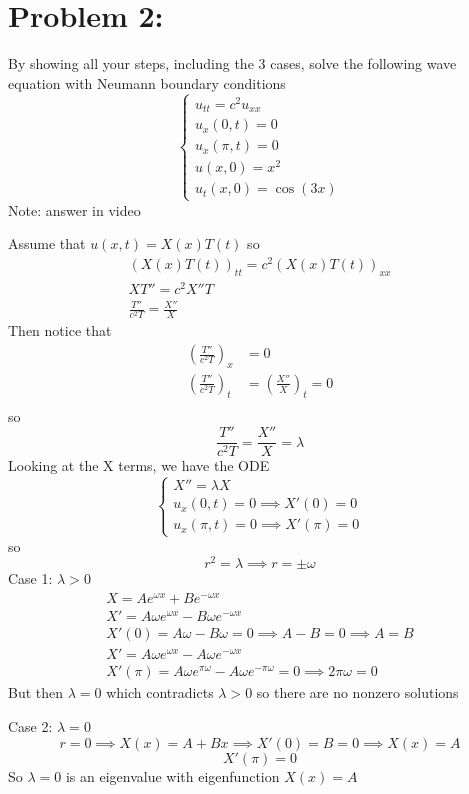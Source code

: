 \documentclass[12pt]{article}
\begin{document}
\pagebreak
\section*{Problem 2:}
By showing all your steps, including the 3 cases, solve the following wave equation with Neumann boundary conditions
\[\begin{cases}
    u_{tt} = c^2u_{xx}\\
    u_x(0, t) = 0\\
    u_x(\pi, t) = 0\\
    u(x, 0) = x^2\\
    u_t(x, 0) = \cos(3x)
\end{cases}\]
Note: answer in video 

\color{blue}
Assume that $u(x, t) = X(x)T(t)$ so
\begin{gather*}
    ( X(x)T(t))_{tt} = c^2( X(x)T(t))_{xx}\\
    XT'' = c^2 X'' T\\
    \frac{T''}{c^2T} = \frac{X''}{X}
\end{gather*}
Then notice that 
\begin{align*}
    \left(\frac{T''}{c^2T}\right)_x &= 0\\
    \left(\frac{T''}{c^2T}\right)_t &= \left(\frac{X''}{X}\right)_t = 0\\
\end{align*}
so 
\[\frac{T''}{c^2T} = \frac{X''}{X} = \lambda\]
Looking at the X terms, we have the ODE 
\[\begin{cases}
    X'' = \lambda X\\
    u_x(0, t) = 0 \implies X'(0) = 0\\
    u_x(\pi, t) = 0\implies X'(\pi) = 0
\end{cases}\]
so 
\[r^2 = \lambda \implies r = \pm \omega\]
Case 1: $\lambda > 0$
\begin{gather*}
    X = Ae^{\omega x} + Be^{-\omega x}\\
    X' = A\omega e^{\omega x} - B\omega e^{-\omega x}\\
    X'(0) = A\omega - B\omega = 0 \implies A - B = 0 \implies A = B\\
    X' = A\omega e^{\omega x} - A\omega e^{-\omega x}\\
    X'(\pi) = A\omega e^{\pi \omega} - A\omega e^{-\pi\omega} = 0 \implies 2\pi\omega = 0
\end{gather*}
But then $\lambda = 0$ which contradicts $\lambda > 0$ so there are no nonzero solutions

Case 2: $\lambda = 0$
\[r = 0 \implies X(x) = A + Bx \implies X'(0) = B = 0 \implies X(x) = A\]
\[X'(\pi) = 0\]
So $\lambda = 0$ is an eigenvalue with eigenfunction $X(x) = A$
\end{document}
